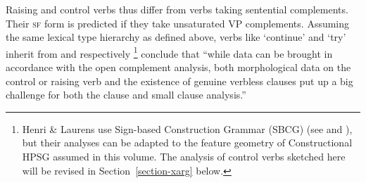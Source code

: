 \documentclass[output=paper
	        ,collection
	        ,collectionchapter
 	        ,biblatex
                ,babelshorthands
                ,newtxmath
                ,draftmode
                ,colorlinks, citecolor=brown
]{langscibook}
\begin{document}
Raising  and control verbs thus differ from verbs taking sentential complements. Their \textsc{sf} form is
predicted if they take unsaturated VP complements. Assuming the same lexical type hierarchy as
defined above, verbs like  `continue' and  `try' inherit from
 and  respectively 
\footnote{Henri \& Laurens use Sign-based Construction Grammar (SBCG) (see  and ), but their analyses can be adapted to the feature geometry of Constructional HPSG
\citep{Sag97a} assumed in this volume. The analysis of control verbs sketched here will be revised in Section~\ref{section-xarg} below.} \citet[]{HenriandLaurens2011} conclude that ``while  data can be brought in accordance with the open complement analysis, both morphological data on the control or raising verb and the existence of genuine verbless clauses put up a big challenge for both the clause and small clause analysis.''

\end{document}
